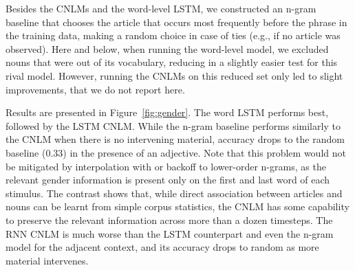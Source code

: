 Besides the CNLMs and the word-level LSTM, we constructed an n-gram baseline that chooses the article that occurs most frequently before the phrase in the training data, making a random choice in case of ties (e.g., if no article was observed). Here and below, when running the word-level model, we excluded nouns that were out of its vocabulary, reducing in a slightly easier test for this rival model. However, running the CNLMs on this reduced set only led to slight improvements, that we do not report here. 

Results are presented in Figure~\ref{fig:gender}. The word LSTM  performs best, followed by the LSTM CNLM.
While the n-gram baseline performs similarly to the CNLM when there is no intervening material, accuracy drops to the random baseline (0.33) in the presence of an adjective.
Note that this problem would not be mitigated by interpolation with or backoff to lower-order n-grams, as the relevant gender information is present only on the first and last word of each stimulus. The contrast shows that, while direct association between articles and nouns can be learnt from simple corpus statistics, the CNLM has some capability to preserve the relevant information across more than a dozen timesteps. The RNN CNLM is much worse than the LSTM counterpart and even the n-gram model for the adjacent context, and its accuracy drops to random as more material intervenes.


